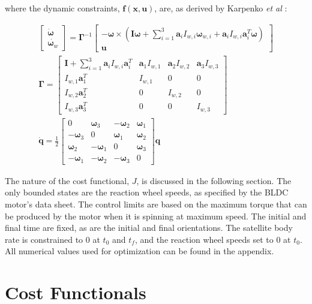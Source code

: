 \documentclass[letterpaper, paper,11pt]{AAS}
\begin{document}
\noindent where the dynamic constraints, $\textbf{f}(\textbf{x},\textbf{u})$, are, as derived by Karpenko \textit{et al} \cite{Karpenko2014}: 


\begin{align*}
\begin{bmatrix}
\dot{\pmb{\omega}}\\
\dot{\pmb{\omega}_{w}}
\end{bmatrix} = \pmb{\Gamma}^{-1} 
\begin{bmatrix}
-\pmb{\omega} \times ( \pmb{I\omega}+\sum_{i=1}^{3}\pmb{a}_{i}I_{w,i}\pmb{\omega}_{w,i} +\pmb{a}_{i}I_{w,i}\pmb{a}_{i}^{T}\pmb{\omega})\\
\pmb{u}
\end{bmatrix}\\
\pmb{\Gamma} = 
\begin{bmatrix}
\pmb{I}+\sum_{i=1}^{3}\pmb{a}_{i}I_{w,i}\pmb{a}_{i}^{T} & \pmb{a}_{1}I_{w,1} & \pmb{a}_{2}I_{w,2} & \pmb{a}_{3}I_{w,3}\\
I_{w,1}\pmb{a}_{1}^{T} & I_{w,1} & 0 & 0\\
I_{w,2}\pmb{a}_{2}^{T} & 0 & I_{w,2} & 0\\
I_{w,3}\pmb{a}_{3}^{T} & 0 & 0 & I_{w,3}
\end{bmatrix}\\
\dot{\pmb{q}} = \frac{1}{2}
\begin{bmatrix}
0 & \pmb{\omega}_{3} & -\pmb{\omega}_{2} & \pmb{\omega}_{1}\\
-\pmb{\omega}_{3} & 0 & \pmb{\omega}_{1} & \pmb{\omega}_{2} \\
\pmb{\omega}_{2} & -\pmb{\omega}_{1} & 0 & \pmb{\omega}_{3} \\
-\pmb{\omega}_{1} & -\pmb{\omega}_{2}& -\pmb{\omega}_{3} & 0 
\end{bmatrix} \pmb{q}
\end{align*}

\noindent The nature of the cost functional, $J$, is discussed in the following section. The only bounded states are the reaction wheel speeds, as specified by the BLDC motor's data sheet.\cite{Faulhaber2014} The control limits are based on the maximum torque that can be produced by the motor when it is spinning at maximum speed. The initial and final time are fixed, as are the initial and final orientations. The satellite body rate is constrained to 0 at $t_0$ and $t_f$, and the reaction wheel speeds set to 0 at $t_0$. All numerical values used for optimization can be found in the appendix.


\section{Cost Functionals}
\label{sec:Cost Functions}
\end{document}
